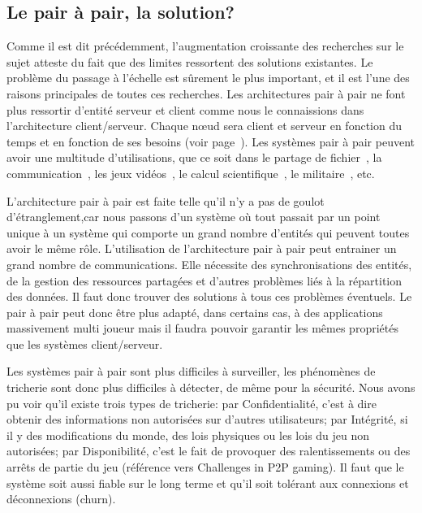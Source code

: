 	\subsection{Le pair à pair, la solution?}
	\par	%
	Comme il est dit précédemment, l'augmentation croissante des recherches sur le sujet atteste du fait que des limites ressortent des solutions existantes. Le problème du passage à l'échelle est sûrement le plus important, et il est l'une des raisons principales de toutes ces recherches. Les architectures pair à pair ne font plus ressortir d'entité serveur et client comme nous le connaissions dans l'architecture client/serveur. Chaque nœud sera client et serveur en fonction du temps et en fonction de ses besoins (voir page~\pageref{P2P/ClServ}). Les systèmes pair à pair peuvent avoir une multitude d'utilisations, que ce soit dans le partage de fichier~\cite{gnutella,napster,kazaa}, la communication~\cite{skype}, les jeux vidéos~\cite{starwars}, le calcul scientifique~\cite{Pastry,xtremweb,chord}, le militaire~\cite{jxta}, etc. \\
	\par L'architecture pair à pair est faite telle qu'il n'y a pas de goulot d'étranglement,car nous passons d'un système où tout passait par un point unique à un système qui comporte un grand nombre d'entités qui peuvent toutes avoir le même rôle. L'utilisation de l'architecture pair à pair peut entrainer un grand nombre de communications. Elle nécessite des synchronisations des entités, de la gestion des ressources partagées et d'autres problèmes liés à la répartition des données. Il faut donc trouver des solutions à tous ces problèmes éventuels. Le pair à pair peut donc être plus adapté, dans certains cas, à des applications massivement multi joueur mais il faudra pouvoir garantir les mêmes propriétés que les systèmes client/serveur. \\
	\par Les systèmes pair à pair sont plus difficiles à surveiller, les phénomènes de tricherie sont donc plus difficiles à détecter, de même pour la sécurité. Nous avons pu voir qu'il existe trois types de tricherie: par Confidentialité, c'est à dire obtenir des informations non autorisées sur d'autres utilisateurs; par Intégrité, si il y des modifications du monde, des lois physiques ou les lois du jeu non autorisées; par Disponibilité, c'est le fait de provoquer des ralentissements ou des arrêts de partie du jeu (référence vers Challenges in P2P gaming). Il faut que le système soit aussi fiable sur le long terme et qu'il soit tolérant aux connexions et déconnexions (churn).\\
